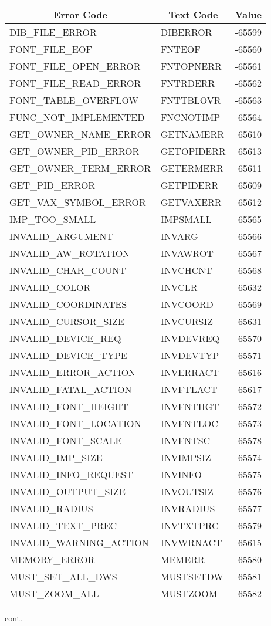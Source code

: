 \begin{tabular}{|l|l|c|}
\hline
\multicolumn{1}{|c|}{Error Code}
&\multicolumn{1}{|c|}{Text Code}
&\multicolumn{1}{|c|}{Value}\\
\hline
DIB\_FILE\_ERROR & DIBERROR & -65599\\
FONT\_FILE\_EOF & FNTEOF & -65560\\
FONT\_FILE\_OPEN\_ERROR & FNTOPNERR & -65561\\
FONT\_FILE\_READ\_ERROR & FNTRDERR & -65562\\
FONT\_TABLE\_OVERFLOW & FNTTBLOVR & -65563\\
FUNC\_NOT\_IMPLEMENTED & FNCNOTIMP & -65564\\
GET\_OWNER\_NAME\_ERROR & GETNAMERR & -65610\\
GET\_OWNER\_PID\_ERROR & GETOPIDERR & -65613\\
GET\_OWNER\_TERM\_ERROR & GETERMERR & -65611\\
GET\_PID\_ERROR & GETPIDERR & -65609\\
GET\_VAX\_SYMBOL\_ERROR & GETVAXERR & -65612\\
IMP\_TOO\_SMALL & IMPSMALL & -65565\\
INVALID\_ARGUMENT & INVARG & -65566\\
INVALID\_AW\_ROTATION & INVAWROT & -65567\\
INVALID\_CHAR\_COUNT & INVCHCNT & -65568\\
INVALID\_COLOR & INVCLR & -65632\\
INVALID\_COORDINATES & INVCOORD & -65569\\
INVALID\_CURSOR\_SIZE & INVCURSIZ & -65631\\
INVALID\_DEVICE\_REQ & INVDEVREQ & -65570\\
INVALID\_DEVICE\_TYPE & INVDEVTYP & -65571\\
INVALID\_ERROR\_ACTION & INVERRACT & -65616\\
INVALID\_FATAL\_ACTION & INVFTLACT & -65617\\
INVALID\_FONT\_HEIGHT & INVFNTHGT & -65572\\
INVALID\_FONT\_LOCATION & INVFNTLOC & -65573\\
INVALID\_FONT\_SCALE & INVFNTSC & -65578\\
INVALID\_IMP\_SIZE & INVIMPSIZ & -65574\\
INVALID\_INFO\_REQUEST & INVINFO & -65575\\
INVALID\_OUTPUT\_SIZE & INVOUTSIZ & -65576\\
INVALID\_RADIUS & INVRADIUS & -65577\\
INVALID\_TEXT\_PREC & INVTXTPRC & -65579\\
INVALID\_WARNING\_ACTION & INVWRNACT & -65615\\
MEMORY\_ERROR & MEMERR & -65580\\
MUST\_SET\_ALL\_DWS & MUSTSETDW & -65581\\
MUST\_ZOOM\_ALL & MUSTZOOM & -65582\\
\hline
\end{tabular}
\newpage
cont.

